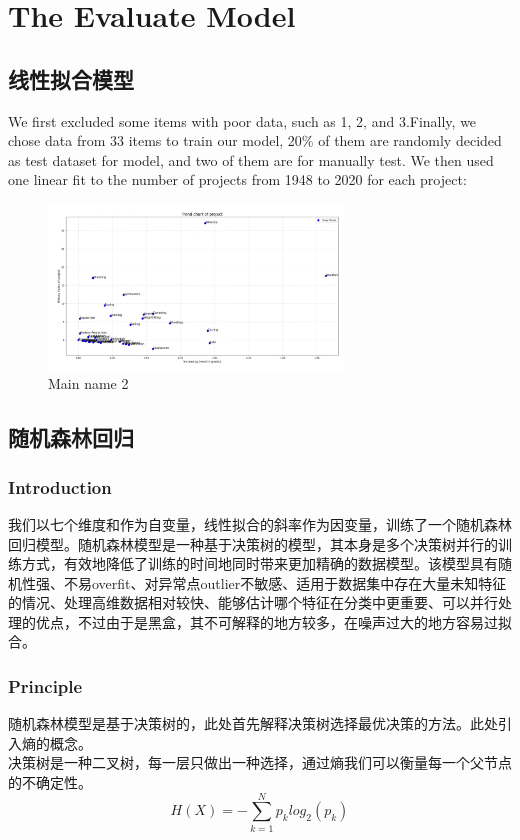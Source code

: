 \documentclass[a4paper]{article}
\begin{document}
\section{The Evaluate Model}
\subsection{线性拟合模型}
We first excluded some items with poor data, such as 1, 2, and 3.Finally, we chose data from 33 items to train our model, 20\% of them are randomly decided as test dataset for model, and two of them are for manually test.
We then used one linear fit to the number of projects from 1948 to 2020 for each project:
\captionsetup[listing]{labelformat=empty}
\begin{figure}[H] %
    \centering %
    \includegraphics[width=0.7\textwidth]{TrendChartOfProject} %
    \caption{Main name 2} %
    \label{Fig.main2} %
    \end{figure}

\subsection{随机森林回归}
\subsubsection{Introduction}

我们以七个维度和作为自变量，线性拟合的斜率作为因变量，训练了一个随机森林回归模型。随机森林模型是一种基于决策树的模型，其本身是多个决策树并行的训练方式，有效地降低了训练的时间地同时带来更加精确的数据模型。该模型具有随机性强、不易overfit、对异常点outlier不敏感、适用于数据集中存在大量未知特征的情况、处理高维数据相对较快、能够估计哪个特征在分类中更重要、可以并行处理的优点，不过由于是黑盒，其不可解释的地方较多，在噪声过大的地方容易过拟合。
\subsubsection{Principle}
随机森林模型是基于决策树的，此处首先解释决策树选择最优决策的方法。此处引入熵的概念。\\
决策树是一种二叉树，每一层只做出一种选择，通过熵我们可以衡量每一个父节点的不确定性。\\
$$H(X)= -\sum_{k=1}^N p_k log_2(p_k)$$
\end{document}
